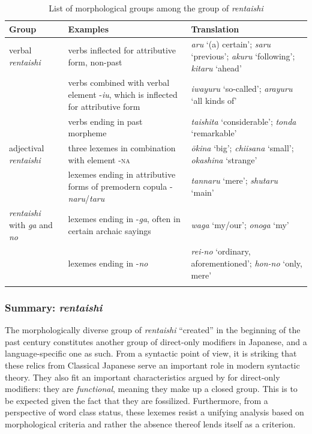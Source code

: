 \begin{table}[t]
\caption{List of morphological groups among the group of \textit{rentaishi}}
\label{tab:listrentaishi}
\begin{tabularx}{\textwidth}{lQQ}
\lsptoprule
\textbf{Group} & \textbf{Examples} & \textbf{Translation} \\
\midrule
verbal \textit{rentaishi} & verbs inflected for attributive form, non-past & \textit{aru} `(a) certain'; \textit{saru} `previous'; \textit{akuru} `following'; \textit{kitaru} `ahead' \\
\tablevspace
& verbs combined with verbal element -\textit{iu}, which is inflected for attributive form & \textit{iwayuru} `so-called'; \textit{arayuru} `all kinds of'\\
\tablevspace
& verbs ending in past morpheme & \textit{taishita} `considerable'; \textit{tonda} `remarkable'\\
\tablevspace
adjectival \textit{rentaishi} & three lexemes in combination with element -\textsc{na} & \textit{ōkina} `big'; \textit{chiisana} `small'; \textit{okashina} `strange'\\
\tablevspace
& lexemes ending in attributive forms of premodern copula -\textit{naru}/\textit{taru} & \textit{tannaru} `mere'; \textit{shutaru} `main'\\
\tablevspace
\textit{rentaishi} with \textit{ga} and \textit{no} & lexemes ending in -\textit{ga}, often in certain archaic sayings & \textit{waga} `my/our'; \textit{onoga} `my'\\
\tablevspace
& lexemes ending in -\textit{no} & \textit{rei-no} `ordinary, aforementioned'; \textit{hon-no} `only, mere'\\
\lspbottomrule
\end{tabularx}
\end{table}
\newpage
\subsubsection{Summary: \textit{rentaishi}}

The morphologically diverse group of \textit{rentaishi} ``created'' in the beginning of the past century constitutes another group of direct-only modifiers in Japanese, and a language-specific one as such. From a syntactic point of view, it is striking that these relics from Classical Japanese serve an important role in modern syntactic theory. They also fit an important characteristics argued by \citet{cinque:2010:adj} for direct-only modifiers: they are \textit{functional}, meaning they make up a closed group. This is to be expected given the fact that they are fossilized. Furthermore, from a perspective of word class status, these lexemes resist a unifying analysis based on morphological criteria and rather the absence thereof lends itself as a criterion.

